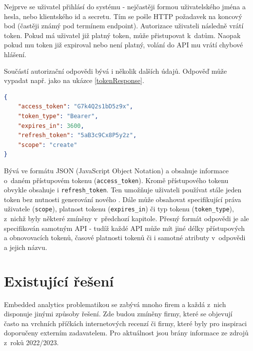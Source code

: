 \documentclass[czech, bc, kiv, he, iso690numb, viewonly]{fasthesis} %
\begin{document}
Nejprve se uživatel přihlásí do systému - nejčastěji formou uživatelského jména a hesla, nebo klientského id a secretu. Tím se pošle HTTP požadavek na koncový bod (častěji známý pod termínem endpoint). 
Autorizace uživateli následně vrátí token. Pokud má uživatel již platný token, může přistupovat k~datům. Naopak pokud mu token již expiroval nebo není platný, volání do API mu vrátí chybové hlášení. 

Součástí autorizační odpovědi bývá i několik dalších údajů. Odpověď může vypadat např. jako na ukázce \ref{tokenResponse}. 

\begin{minipage}[c]{0.95\textwidth}
\begin{lstlisting}[language=json, caption={Ukázková odpověď autorizačního serveru}, label=tokenResponse]
{
	"access_token": "G7k4Q2s1bD5z9x",
	"token_type": "Bearer",
	"expires_in": 3600,
	"refresh_token": "5aB3c9Cx8P5y2z",
	"scope": "create"
}
\end{lstlisting}
\end{minipage}

Bývá ve formátu JSON (JavaScript Object Notation) a obsahuje informace o~daném přístupovém tokenu (\texttt{access\_token}). Kromě přístupového tokenu obvykle obsahuje i \texttt{refresh\_token}. Ten umožňuje uživateli 
používat stále jeden token bez nutnosti generování nového \cite{oauthResponseExample}. Dále může obsahovat specifikující práva uživatele (\texttt{scope}), platnost tokenu (\texttt{expires\_in}) či typ tokenu (\texttt{token\_type}), z~nichž byly některé zmíněny v~předchozí kapitole.
Přesný formát odpovědi je ale specifikován samotným API - tudíž každé API může mít jiné délky přístupových a obnovovacích tokenů, časové platnosti tokenů či i samotné atributy v~odpovědi a jejich názvu.
%
%
\section{Existující řešení}
Embedded analytics problematikou se zabývá mnoho firem a každá z~nich disponuje jinými způsoby řešení. Zde budou zmíněny firmy, které se objevují často na vrchních příčkách
internetových recenzí či firmy, které byly pro inspiraci doporučeny externím zadavatelem. Pro aktuálnost jsou brány informace ze zdrojů z~roků 2022/2023.
\end{document}
